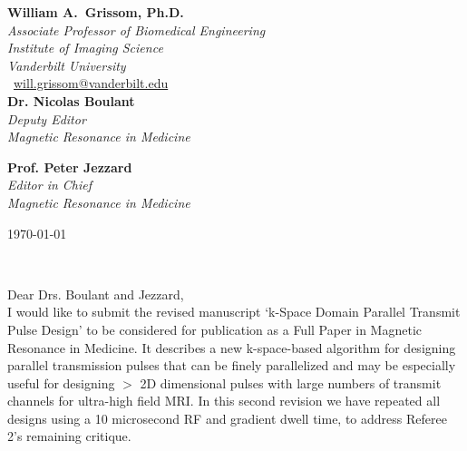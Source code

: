 \documentclass[11pt]{article}
\def\firstname{William A.}
\def\familyname{Grissom, Ph.D.}
\begin{document}
\sffamily   %
\raggedright%
{\bfseries \firstname~\familyname}\\[.35ex]
\small{\itshape%
Associate Professor of Biomedical Engineering\\
Institute of Imaging Science\\
Vanderbilt University\\}
\Letter~\href{mailto:will.grissom@vanderbilt.edu}{will.grissom@vanderbilt.edu}\\[2em]
{\bfseries Dr. Nicolas Boulant}\\[.35ex]
\small{\itshape
Deputy Editor\\
Magnetic Resonance in Medicine\\[1em]}

{\bfseries Prof. Peter Jezzard}\\[.35ex]
\small{\itshape
Editor in Chief\\
Magnetic Resonance in Medicine\\[1em]}


%
\large
\hfill\begin{minipage}[t]{\textwidth} %
\raggedleft %
\today
\end{minipage}\\[2em]
\raggedright
Dear Drs. Boulant and Jezzard,\\[1.5em]
%
I would like to submit the revised manuscript `k-Space Domain Parallel Transmit Pulse Design' to be considered
for publication as a Full Paper in Magnetic Resonance in Medicine. 
It describes a new k-space-based algorithm for designing parallel transmission pulses that can be finely parallelized
and may be especially useful for designing $>$ 2D dimensional pulses with large numbers of transmit channels
for ultra-high field MRI. 
In this second revision we have repeated all designs using a 10 microsecond RF and gradient dwell time,
to address Referee 2's remaining critique. 
\end{document}
